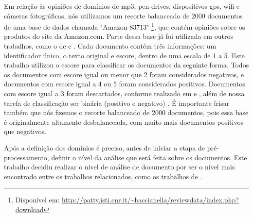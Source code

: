 \documentclass[template.tex]{subfiles}
\begin{document}
Em relação às opiniões de domínios de mp3, pen-drives, dispositivos gps, wifi e câmeras fotográficas, nós utilizamos um recorte balanceado de 2000 documentos de uma base de dados chamada  "Amazon-83713" \footnote{Disponível em: \url{http://patty.isti.cnr.it/~baccianella/reviewdata/index.php?download}}, que contém opiniões sobre os produtos do site da Amazon.com. Parte dessa base já foi utilizada em outros trabalhos, como o de  e . Cada documento contém três informações: um identificador único, o texto original e escore, dentro de uma escala de 1 a 5. Este trabalho utilizou o escore para classificar os documentos da seguinte forma. Todos os documentos com escore igual ou menor que 2 foram considerados negativos, e documentos com escore igual a 4 ou 5 foram considerados positivos. Documentos com escore igual a 3 foram descartados, conforme realizado em \cite{khan2011sentiment} e  \cite{pang2004sentimental}, além de nossa tarefa de classificação ser binária (positivo e negativo) . É importante frisar também que nós fizemos o recorte balanceado de 2000 documentos, pois essa base é originalmente altamente desbalanceada, com muito mais documentos positivos que negativos.  



Após a definição dos domínios é preciso, antes de iniciar a etapa de pré-processamento, definir o nível da análise que será feita sobre os documentos. Este trabalho decidiu realizar o nível de análise de documento por ser o nível mais encontrado entre os trabalhos relacionados, como os trabalhos de . 
\end{document}
